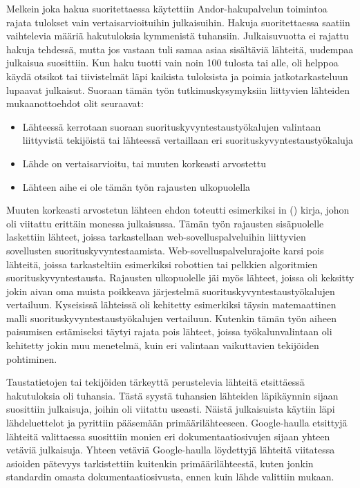 Melkein joka hakua suoritettaessa käytettiin Andor-hakupalvelun toimintoa rajata tulokset vain vertaisarvioituihin julkaisuihin. Hakuja suoritettaessa saatiin vaihtelevia määriä hakutuloksia kymmenistä tuhansiin. Julkaisuvuotta ei rajattu hakuja tehdessä, mutta jos vastaan tuli samaa asiaa sisältäviä lähteitä, uudempaa julkaisua suosittiin. Kun haku tuotti vain noin 100 tulosta tai alle, oli helppoa käydä otsikot tai tiivistelmät läpi kaikista tuloksista ja poimia jatkotarkasteluun lupaavat julkaisut. Suoraan tämän työn tutkimuskysymyksiin liittyvien lähteiden mukaanottoehdot olit seuraavat:

\begin{itemize}
    \item Lähteessä kerrotaan suoraan suorituskyvyntestaustyökalujen valintaan liittyvistä tekijöistä tai lähteessä vertaillaan eri suorituskyvyntestaustyökaluja
    \item Lähde on vertaisarvioitu, tai muuten korkeasti arvostettu
    \item Lähteen aihe ei ole tämän työn rajausten ulkopuolella
\end{itemize}

Muuten korkeasti arvostetun lähteen ehdon toteutti esimerkiksi \citeauthor{TheArtOfApplication}in (\citeyear{TheArtOfApplication}) kirja, johon oli viitattu erittäin monessa julkaisussa. Tämän työn rajausten sisäpuolelle laskettiin lähteet, joissa tarkastellaan web-sovelluspalveluihin liittyvien sovellusten suorituskyvyntestaamista. Web-sovelluspalvelurajoite karsi pois lähteitä, joissa tarkasteltiin esimerkiksi robottien tai pelkkien algoritmien suorituskyvyntestausta. Rajausten ulkopuolelle jäi myös lähteet, joissa oli keksitty jokin aivan oma muista poikkeava järjestelmä suorituskyvyntestaustyökalujen vertailuun. Kyseisissä lähteissä oli kehitetty esimerkiksi täysin matemaattinen malli suorituskyvyntestaustyökalujen vertailuun. Kutenkin tämän työn aiheen paisumisen estämiseksi täytyi rajata pois lähteet, joissa työkalunvalintaan oli kehitetty jokin muu menetelmä, kuin eri valintaan vaikuttavien tekijöiden pohtiminen.

Taustatietojen tai tekijöiden tärkeyttä perustelevia lähteitä etsittäessä hakutuloksia oli tuhansia. Tästä syystä tuhansien lähteiden läpikäynnin sijaan suosittiin julkaisuja, joihin oli viitattu useasti. Näistä julkaisuista käytiin läpi lähdeluettelot ja pyrittiin pääsemään primäärilähteeseen. Google-haulla etsittyjä lähteitä valittaessa suosittiin monien eri dokumentaatiosivujen sijaan yhteen vetäviä julkaisuja. Yhteen vetäviä Google-haulla löydettyjä lähteitä viitatessa asioiden pätevyys tarkistettiin kuitenkin primäärilähteestä, kuten jonkin standardin omasta dokumentaatiosivusta, ennen kuin lähde valittiin mukaan.
